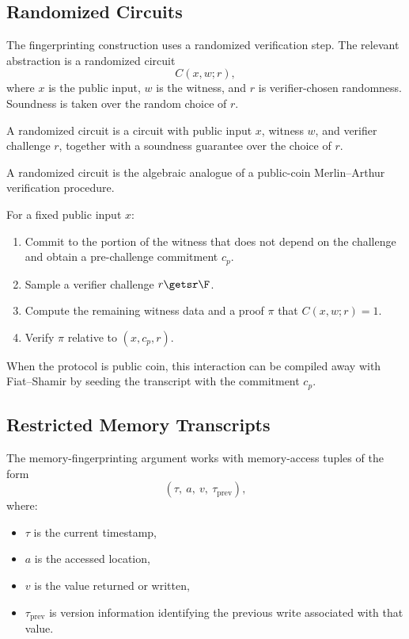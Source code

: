 \documentclass[11pt]{article}
\begin{document}
\subsection{Randomized Circuits}

The fingerprinting construction uses a randomized verification step.  The
relevant abstraction is a randomized circuit
\[
  C(x,w;r),
\]
where $x$ is the public input, $w$ is the witness, and $r$ is verifier-chosen
randomness.  Soundness is taken over the random choice of $r$.

\begin{definition}
A randomized circuit is a circuit with public input $x$, witness $w$, and
verifier challenge $r$, together with a soundness guarantee over the choice of
$r$.
\end{definition}

A randomized circuit is the algebraic analogue of a public-coin
Merlin--Arthur verification procedure.

\begin{highlight}[title={Randomized Memory-Fingerprinting Pattern}]
For a fixed public input $x$:
\begin{enumerate}
  \item Commit to the portion of the witness that does not depend on the
        challenge and obtain a pre-challenge commitment $c_p$.
  \item Sample a verifier challenge $r \getsr \F$.
  \item Compute the remaining witness data and a proof $\pi$ that
        $C(x,w;r)=1$.
  \item Verify $\pi$ relative to $(x,c_p,r)$.
\end{enumerate}
\end{highlight}

When the protocol is public coin, this interaction can be compiled away with
Fiat--Shamir by seeding the transcript with the commitment $c_p$.

\subsection{Restricted Memory Transcripts}

The memory-fingerprinting argument works with memory-access tuples of the form
\[
  (\tau,\ a,\ v,\ \tau_{\mathrm{prev}}),
\]
where:
\begin{itemize}
  \item $\tau$ is the current timestamp,
  \item $a$ is the accessed location,
  \item $v$ is the value returned or written,
  \item $\tau_{\mathrm{prev}}$ is version information identifying the previous write
        associated with that value.
\end{itemize}
\end{document}
